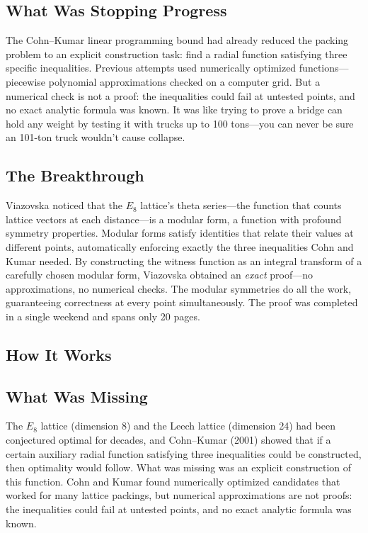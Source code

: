 \subsection{What Was Stopping Progress}
The Cohn--Kumar linear programming bound had already reduced the packing problem to an explicit construction task: find a radial function satisfying three specific inequalities. Previous attempts used numerically optimized functions---piecewise polynomial approximations checked on a computer grid. But a numerical check is not a proof: the inequalities could fail at untested points, and no exact analytic formula was known. It was like trying to prove a bridge can hold any weight by testing it with trucks up to 100 tons---you can never be sure an 101-ton truck wouldn't cause collapse.

\subsection{The Breakthrough}
Viazovska noticed that the $E_8$ lattice's theta series---the function that counts lattice vectors at each distance---is a modular form, a function with profound symmetry properties. Modular forms satisfy identities that relate their values at different points, automatically enforcing exactly the three inequalities Cohn and Kumar needed. By constructing the witness function as an integral transform of a carefully chosen modular form, Viazovska obtained an \emph{exact} proof---no approximations, no numerical checks. The modular symmetries do all the work, guaranteeing correctness at every point simultaneously. The proof was completed in a single weekend and spans only 20 pages.

\subsection{How It Works}

\subsection{What Was Missing}
The $E_8$ lattice (dimension 8) and the Leech lattice (dimension 24) had been conjectured optimal for decades, and Cohn--Kumar (2001) showed that if a certain auxiliary radial function satisfying three inequalities could be constructed, then optimality would follow. What was missing was an explicit construction of this function. Cohn and Kumar found numerically optimized candidates that worked for many lattice packings, but numerical approximations are not proofs: the inequalities could fail at untested points, and no exact analytic formula was known.

